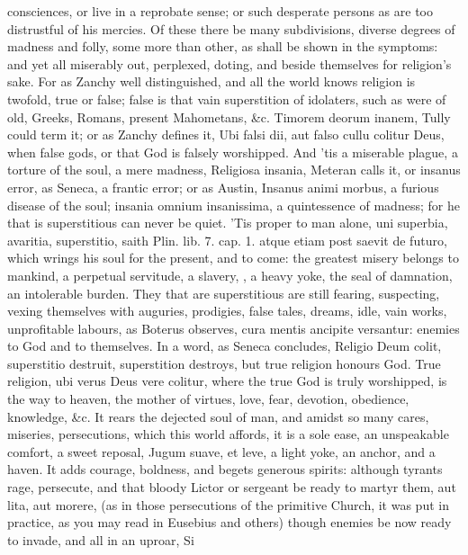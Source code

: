 {consciences, or live in a reprobate sense; or such desperate persons as
are too distrustful of his mercies. Of these there be many
subdivisions, diverse degrees of madness and folly, some more than
other, as shall be shown in the symptoms: and yet all miserably out,
perplexed, doting, and beside themselves for religion's sake. For as
Zanchy well distinguished, and all the world knows religion is
twofold, true or false; false is that vain superstition of idolaters,
such as were of old, Greeks, Romans, present Mahometans, \&c. Timorem
deorum inanem, Tully could term it; or as Zanchy defines it, Ubi
falsi dii, aut falso cullu colitur Deus, when false gods, or that God
is falsely worshipped. And 'tis a miserable plague, a torture of the
soul, a mere madness, Religiosa insania, Meteran calls it, or
insanus error, as Seneca, a frantic error; or as Austin, Insanus
animi morbus, a furious disease of the soul; insania omnium
insanissima, a quintessence of madness; for he that is
superstitious can never be quiet. 'Tis proper to man alone, uni
superbia, avaritia, superstitio, saith Plin. lib. 7. cap. 1. atque
etiam post saevit de futuro, which wrings his soul for the present, and
to come: the greatest misery belongs to mankind, a perpetual servitude,
a slavery, , a heavy yoke, the seal of damnation,
an intolerable burden. They that are superstitious are still fearing,
suspecting, vexing themselves with auguries, prodigies, false tales,
dreams, idle, vain works, unprofitable labours, as Boterus
observes, cura mentis ancipite versantur: enemies to God and to
themselves. In a word, as Seneca concludes, Religio Deum colit,
superstitio destruit, superstition destroys, but true religion honours
God. True religion, ubi verus Deus vere colitur, where the true God is
truly worshipped, is the way to heaven, the mother of virtues, love,
fear, devotion, obedience, knowledge, \&c. It rears the dejected soul of
man, and amidst so many cares, miseries, persecutions, which this world
affords, it is a sole ease, an unspeakable comfort, a sweet reposal,
Jugum suave, et leve, a light yoke, an anchor, and a haven. It adds
courage, boldness, and begets generous spirits: although tyrants rage,
persecute, and that bloody Lictor or sergeant be ready to martyr them,
aut lita, aut morere, (as in those persecutions of the primitive
Church, it was put in practice, as you may read in Eusebius and others)
though enemies be now ready to invade, and all in an uproar, Si
}
